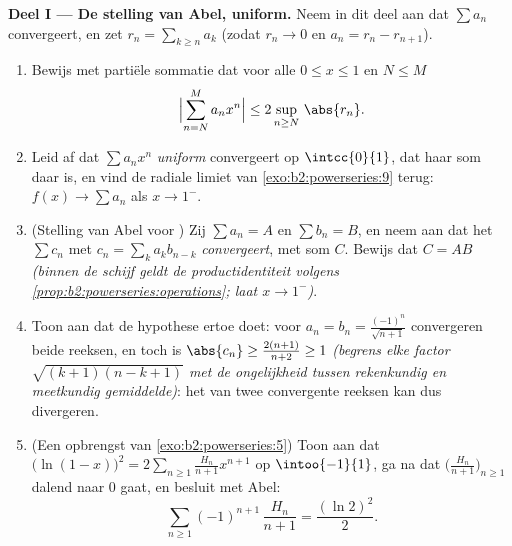 \begin{problem}
\medskip
\noindent\textbf{Deel I --- De stelling van Abel, uniform.} Neem in
dit deel aan dat $\sum a_n$ convergeert, en zet $r_n = \sum_{k\geq
n} a_k$ (zodat $r_n \to 0$ en $a_n = r_n - r_{n+1}$).
\begin{enumerate}
  \item Bewijs met partiële sommatie dat voor alle $0 \leq x \leq
        1$ en $N \leq M$
        \[
        \Bigl|\sum_{n=N}^{M} a_n x^n\Bigr|
        \leq 2\sup_{n \geq N}\,\abs{r_n} .
        \]
  \item Leid af dat $\sum a_nx^n$ \emph{uniform} convergeert op
        $\intcc{0}{1}$, dat haar som daar  is, en vind de
        radiale limiet van \cref{exo:b2:powerseries:9} terug:
        $f(x) \to \sum a_n$ als $x \to 1^-$.
  \item (Stelling van Abel voor ) Zij $\sum a_n =
        A$ en $\sum b_n = B$, en neem aan dat het 
        $\sum c_n$ met $c_n = \sum_{k} a_kb_{n-k}$
        \emph{convergeert}, met som $C$. Bewijs dat $C = AB$
        \emph{(binnen de schijf geldt de productidentiteit volgens
        \cref{prop:b2:powerseries:operations}; laat $x \to
        1^-$)}.
  \item Toon aan dat de hypothese ertoe doet: voor $a_n = b_n =
        \frac{(-1)^n}{\sqrt{n+1}}$ convergeren beide reeksen, en
        toch is $\abs{c_n} \geq \frac{2(n+1)}{n+2} \geq 1$
        \emph{(begrens elke factor $\sqrt{(k+1)(n-k+1)}$ met de
        ongelijkheid tussen rekenkundig en meetkundig
        gemiddelde)}: het  van twee convergente
        reeksen kan dus divergeren.
  \item (Een opbrengst van \cref{exo:b2:powerseries:5}) Toon aan
        dat $\bigl(\ln(1-x)\bigr)^2 = 2\sum_{n\geq1}
        \frac{H_n}{n+1}x^{n+1}$ op $\intoo{-1}{1}$, ga na dat
        $\bigl(\frac{H_n}{n+1}\bigr)_{n\geq1}$ dalend naar $0$
        gaat, en besluit met Abel:
        \[
        \sum_{n\geq1} (-1)^{n+1}\,\frac{H_n}{n+1}
        = \frac{(\ln 2)^2}{2} .
        \]
\end{enumerate}


\end{problem}
